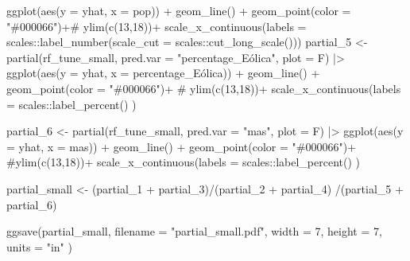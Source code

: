 \documentclass[
]{report}
\newenvironment{Shaded}{\begin{snugshade}}{\end{snugshade}}
\newcommand{\AttributeTok}[1]{\textcolor[rgb]{0.40,0.45,0.13}{#1}}
\newcommand{\CommentTok}[1]{\textcolor[rgb]{0.37,0.37,0.37}{#1}}
\newcommand{\DecValTok}[1]{\textcolor[rgb]{0.68,0.00,0.00}{#1}}
\newcommand{\FunctionTok}[1]{\textcolor[rgb]{0.28,0.35,0.67}{#1}}
\newcommand{\NormalTok}[1]{\textcolor[rgb]{0.00,0.23,0.31}{#1}}
\newcommand{\OtherTok}[1]{\textcolor[rgb]{0.00,0.23,0.31}{#1}}
\newcommand{\SpecialCharTok}[1]{\textcolor[rgb]{0.37,0.37,0.37}{#1}}
\newcommand{\StringTok}[1]{\textcolor[rgb]{0.13,0.47,0.30}{#1}}
\begin{document}
\begin{Shaded}
\begin{Highlighting}[]
  \FunctionTok{ggplot}\NormalTok{(}\FunctionTok{aes}\NormalTok{(}\AttributeTok{y =}\NormalTok{ yhat, }\AttributeTok{x =}\NormalTok{ pop)) }\SpecialCharTok{+} \FunctionTok{geom\_line}\NormalTok{() }\SpecialCharTok{+}
  \FunctionTok{geom\_point}\NormalTok{(}\AttributeTok{color =} \StringTok{"\#000066"}\NormalTok{)}\SpecialCharTok{+}\CommentTok{\# ylim(c(13,18))+}
  \FunctionTok{scale\_x\_continuous}\NormalTok{(}\AttributeTok{labels =}\NormalTok{ scales}\SpecialCharTok{::}\FunctionTok{label\_number}\NormalTok{(}\AttributeTok{scale\_cut =}\NormalTok{ scales}\SpecialCharTok{::}\FunctionTok{cut\_long\_scale}\NormalTok{())) }
\NormalTok{partial\_5 }\OtherTok{\textless{}{-}} \FunctionTok{partial}\NormalTok{(rf\_tune\_small, }\AttributeTok{pred.var =} \StringTok{"percentage\_Eólica"}\NormalTok{, }\AttributeTok{plot =}\NormalTok{ F) }\SpecialCharTok{|\textgreater{}} 
  \FunctionTok{ggplot}\NormalTok{(}\FunctionTok{aes}\NormalTok{(}\AttributeTok{y =}\NormalTok{ yhat, }\AttributeTok{x =}\NormalTok{ percentage\_Eólica)) }\SpecialCharTok{+} \FunctionTok{geom\_line}\NormalTok{() }\SpecialCharTok{+}
  \FunctionTok{geom\_point}\NormalTok{(}\AttributeTok{color =} \StringTok{"\#000066"}\NormalTok{)}\SpecialCharTok{+} \CommentTok{\# ylim(c(13,18))+}
  \FunctionTok{scale\_x\_continuous}\NormalTok{(}\AttributeTok{labels =}\NormalTok{ scales}\SpecialCharTok{::}\FunctionTok{label\_percent}\NormalTok{() )}

\NormalTok{partial\_6 }\OtherTok{\textless{}{-}} \FunctionTok{partial}\NormalTok{(rf\_tune\_small, }\AttributeTok{pred.var =} \StringTok{"mas"}\NormalTok{, }\AttributeTok{plot =}\NormalTok{ F) }\SpecialCharTok{|\textgreater{}} 
  \FunctionTok{ggplot}\NormalTok{(}\FunctionTok{aes}\NormalTok{(}\AttributeTok{y =}\NormalTok{ yhat, }\AttributeTok{x =}\NormalTok{ mas)) }\SpecialCharTok{+} \FunctionTok{geom\_line}\NormalTok{() }\SpecialCharTok{+}
  \FunctionTok{geom\_point}\NormalTok{(}\AttributeTok{color =} \StringTok{"\#000066"}\NormalTok{)}\SpecialCharTok{+} \CommentTok{\#ylim(c(13,18))+}
  \FunctionTok{scale\_x\_continuous}\NormalTok{(}\AttributeTok{labels =}\NormalTok{ scales}\SpecialCharTok{::}\FunctionTok{label\_percent}\NormalTok{() ) }

\NormalTok{partial\_small }\OtherTok{\textless{}{-}}\NormalTok{ (partial\_1 }\SpecialCharTok{+}\NormalTok{ partial\_3)}\SpecialCharTok{/}\NormalTok{(partial\_2 }\SpecialCharTok{+}\NormalTok{ partial\_4) }\SpecialCharTok{/}\NormalTok{(partial\_5 }\SpecialCharTok{+}\NormalTok{ partial\_6)}

\FunctionTok{ggsave}\NormalTok{(partial\_small, }\AttributeTok{filename =} \StringTok{"partial\_small.pdf"}\NormalTok{, }\AttributeTok{width =} \DecValTok{7}\NormalTok{, }\AttributeTok{height =} \DecValTok{7}\NormalTok{, }\AttributeTok{units =} \StringTok{"in"}\NormalTok{ )}
\end{Highlighting}
\end{Shaded}
\end{document}
